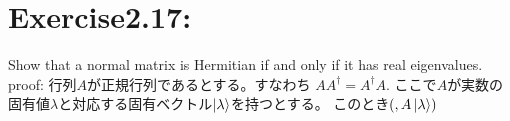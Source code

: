 \section{\Large Exercise2.17:} Show that a normal matrix is
Hermitian if and only if it has real eigenvalues.
\newline
{\large proof:}
行列$A$が正規行列であるとする。すなわち
$AA^\dagger = A^\dagger A$.
ここで$A$が実数の固有値$\lambda$と対応する固有ベクトル$\ket{\lambda}$を持つとする。
このとき$(,A\ket{\lambda})$
